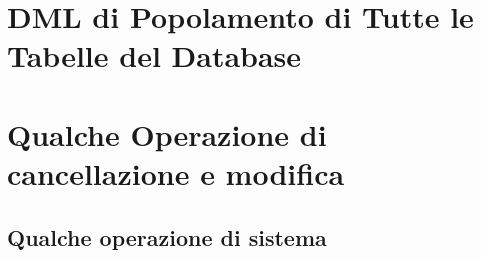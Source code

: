 \documentclass[letterpaper]{report}
\begin{document}
\clearpage
\section{DML di Popolamento di Tutte le Tabelle del Database}


\clearpage
\section{Qualche Operazione di cancellazione e modifica}


\subsection{Qualche operazione di sistema}

\end{document}
